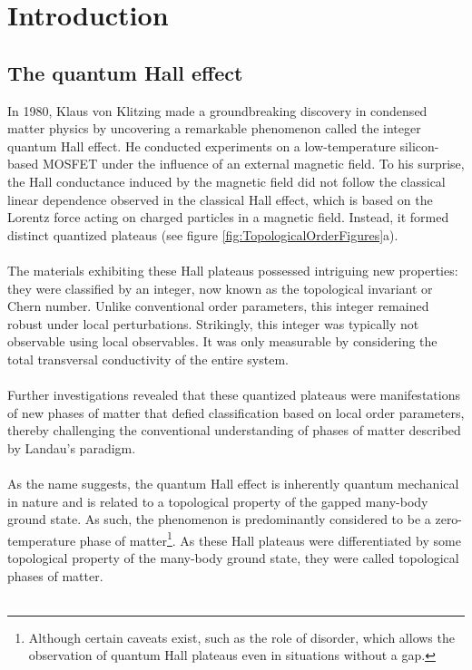 \chapter{Introduction}\label{ch:introduction}
\section{The quantum Hall effect}
In 1980, Klaus von Klitzing made a groundbreaking discovery in condensed matter physics by uncovering a remarkable phenomenon called the integer quantum Hall effect. He conducted experiments on a low-temperature silicon-based MOSFET under the influence of an external magnetic field. To his surprise, the Hall conductance induced by the magnetic field did not follow the classical linear dependence observed in the classical Hall effect, which is based on the Lorentz force acting on charged particles in a magnetic field. Instead, it formed distinct quantized plateaus (see figure \ref{fig:TopologicalOrderFigures}a).
\\\\
The materials exhibiting these Hall plateaus possessed intriguing new properties: they were classified by an integer, now known as the topological invariant or Chern number. Unlike conventional order parameters, this integer remained robust under local perturbations. Strikingly, this integer was typically not observable using local observables. It was only measurable by considering the total transversal conductivity of the entire system.
\\\\
Further investigations revealed that these quantized plateaus were manifestations of new phases of matter that defied classification based on local order parameters, thereby challenging the conventional understanding of phases of matter described by Landau's paradigm.
\\\\
As the name suggests, the quantum Hall effect is inherently quantum mechanical in nature and is related to a topological property of the gapped many-body ground state. As such, the phenomenon is predominantly considered to be a zero-temperature phase of matter\footnote{Although certain caveats exist, such as the role of disorder, which allows the observation of quantum Hall plateaus even in situations without a gap.}. As these Hall plateaus were differentiated by some topological property of the many-body ground state, they were called topological phases of matter.
\\\\
